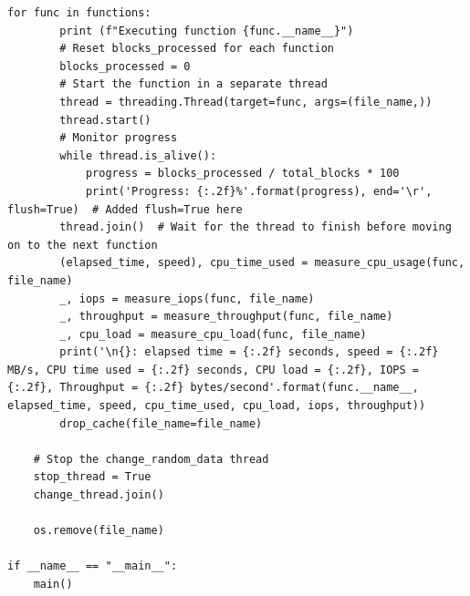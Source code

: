 \begin{lstlisting}[style=Python, caption=Script Python per il benchmarking, label=python-benchmark.py]
    for func in functions:
        print (f"Executing function {func.__name__}")
        # Reset blocks_processed for each function
        blocks_processed = 0
        # Start the function in a separate thread
        thread = threading.Thread(target=func, args=(file_name,))
        thread.start()
        # Monitor progress
        while thread.is_alive():
            progress = blocks_processed / total_blocks * 100
            print('Progress: {:.2f}%'.format(progress), end='\r', flush=True)  # Added flush=True here
        thread.join()  # Wait for the thread to finish before moving on to the next function
        (elapsed_time, speed), cpu_time_used = measure_cpu_usage(func, file_name)
        _, iops = measure_iops(func, file_name)
        _, throughput = measure_throughput(func, file_name)
        _, cpu_load = measure_cpu_load(func, file_name)
        print('\n{}: elapsed time = {:.2f} seconds, speed = {:.2f} MB/s, CPU time used = {:.2f} seconds, CPU load = {:.2f}, IOPS = {:.2f}, Throughput = {:.2f} bytes/second'.format(func.__name__, elapsed_time, speed, cpu_time_used, cpu_load, iops, throughput))
        drop_cache(file_name=file_name)

    # Stop the change_random_data thread
    stop_thread = True
    change_thread.join()

    os.remove(file_name)

if __name__ == "__main__":
    main()
\end{lstlisting}

